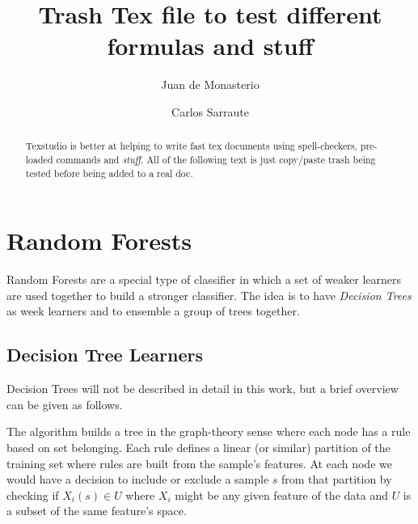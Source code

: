 \documentclass{article}%
\theoremstyle{definition}
\begin{document}

\title{Trash Tex file to test different formulas and stuff}




\author{
Juan de Monasterio
\and Carlos Sarraute
}

%
%


\maketitle
\begin{abstract}

Texstudio is better at helping to write fast tex documents using spell-checkers, pre-loaded commands and \textit{stuff}. All of the following text is just copy/paste trash being tested before being added to a real doc.


\end{abstract}


\section{Random Forests}

Random Forests are a special type of classifier in which a set of weaker learners are used together to build a stronger classifier. The idea is to have \textit{Decision Trees} as week learners and to ensemble a group of trees together.
	
\subsection{Decision Tree Learners}

Decision Trees will not be described in detail in this work, but a brief overview can be given as follows. 

The algorithm builds a tree in the graph-theory sense where each node has a rule based on set belonging. Each rule defines a linear (or similar) partition of the training set where rules are built from the sample's features. At each node we would have a decision to include or exclude a sample $s$ from that partition by checking if $X_i(s) \in U$ where $X_i$ might be any given feature of the data and $U$ is a subset of the same feature's space.
\end{document}

